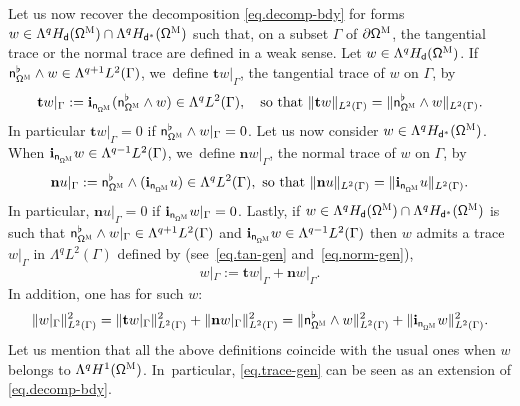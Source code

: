 \documentclass[JEP,XML,SOM,Unicode,NoEqCountersInSection,NoFloatCountersInSection,published]{cedram}
\newcommand{\mbf}[1]{\mathbf{#1}}
\let\pa\partial
\theoremstyle{plain}
\theoremstyle{definition}
\begin{document}
Let us now recover the decomposition \eqref{eq.decomp-bdy} for forms
$w\in \Lambda^q H_{\mathsf d} (\mathsf \Omega^{\textsc{M}})\cap
\Lambda^q H_{\mathsf d^*} (\mathsf \Omega^{\textsc{M}})$ such that,
on a subset $\Gamma$ of $\pa \mathsf \Omega^{\textsc{M}} $, the
tangential trace or the normal trace are defined in a weak sense.
Let $w\in \Lambda^q H_{\mathsf d} (\mathsf \Omega^{\textsc{M}})$. If~$ \mathsf n_{\mathsf \Omega^{\textsc{M}}}^\flat \wedge w \in
\Lambda^{q+1} L^2 (\Gamma)$, we~define $\mbf tw|_\Gamma$, the tangential trace of $w$ on $\Gamma$, by
\begin{equation}
\label{eq.tan-gen}\mathbf t w|_{\Gamma}:= \mathbf{i}_{\mathsf n_{\mathsf \Omega^{\textsc{M}} }}
(\mathsf n_{\mathsf \Omega^{\textsc{M}} }^{\flat} \wedge w) \in \Lambda^{q} L^2(\Gamma),\quad\text{so that } \|\mathbf t w\|_{ L^2(\Gamma)} = \|\mathsf n_{\mathsf \Omega^{\textsc{M}} }^{\flat} \wedge w\|_{ L^2(\Gamma)}.
\end{equation}
In particular $\mbf tw|_\Gamma=0$ if $ \mathsf n_{\mathsf \Omega^{\textsc{M}}}^\flat \wedge w|_\Gamma=0$.
Let us now consider $w \in \Lambda^q H_{\mathsf d^*} (\mathsf \Omega^{\textsc{M}})$.
When $ \mathbf{i}_{\mathsf n_{\mathsf \Omega^{\textsc{M}}}} w\in
\Lambda^{q-1} L^2 (\Gamma)$, we~define $\mbf nw|_\Gamma$, the
normal trace of $w$ on $\Gamma$, by
\begin{equation}
\label{eq.norm-gen}\mathbf n u|_{\Gamma}:= \mathsf n_{\mathsf \Omega^{\textsc{M}} }^{\flat} \wedge
(\mathbf{i}_{\mathsf n_{\mathsf \Omega^{\textsc{M}} }}u) \in \Lambda^{q} L^2(\Gamma), \text{
so that } \|\mathbf n u\|_{ L^2(\Gamma)}
=\|\mathbf{i}_{\mathsf n_{\mathsf \Omega^{\textsc{M}} }}u\|_{ L^2(\Gamma)}.
\end{equation}
In particular, $\mathbf n u|_{\Gamma} =0$ if $ \mathbf{i}_{\mathsf n_{\mathsf \Omega^{\textsc{M}}}} w|_\Gamma=0$.
Lastly, if $w\in \Lambda^qH_{\mathsf d}(\mathsf \Omega^{\textsc{M}})\cap \Lambda^qH_{\mathsf d^*}(\mathsf \Omega^{\textsc{M}})$ is such that $\mathsf n_{\mathsf \Omega^{\textsc{M}} }^{\flat}\wedge w|_{\Gamma}\in \Lambda^{q+1}L^2(\Gamma)$ and $\mathbf{i}_{\mathsf n_{\mathsf \Omega^{\textsc{M}} }}w\in \Lambda^{q-1}L^2(\Gamma)$ then $w$ admits a trace $w|_{\Gamma}$ in $\Lambda^qL^2(\Gamma)$ defined by (see~\eqref{eq.tan-gen} and~\eqref{eq.norm-gen}),
\begin{equation}
\label{eq.trace-gen}
w|_{\Gamma}:= \mathbf tw|_{\Gamma}+
\mathbf n w|_{\Gamma}.
\end{equation}
In addition, one has for such $w$:
\[
\|w|_{\Gamma}\|^2_{ L^2(\Gamma)} =
\| \mathbf t w|_{\Gamma}\|^2_{ L^2(\Gamma)}
+
\|\mathbf n w|_{\Gamma}\|^2_{ L^2(\Gamma)}
=
\|\mathsf n_{\mathsf \Omega^{\textsc{M}} }^{\flat} \wedge w\|_{ L^2(\Gamma)}^2
+
\|\mathbf{i}_{\mathsf n_{\mathsf \Omega^{\textsc{M}} }}w\|_{ L^2(\Gamma)}^2.
\]
Let us mention that all the above definitions coincide
with the usual ones when $w$ belongs to $\Lambda^q H^1 (\mathsf \Omega^{\textsc{M}})$. In~particular, \eqref{eq.trace-gen} can be seen as an extension of \eqref{eq.decomp-bdy}.
\end{document}
